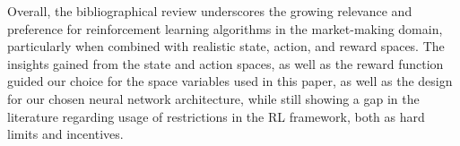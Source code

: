 Overall, the bibliographical review underscores the growing relevance and preference for reinforcement learning algorithms in the market-making domain,
particularly when combined with realistic state, action, and reward spaces.
The insights gained from the state and action spaces, as well as the reward function guided our choice for the space variables used in this paper,
as well as the design for our chosen neural network architecture,
while still showing a gap in the literature regarding usage of restrictions in the RL framework, both as hard limits and incentives.
